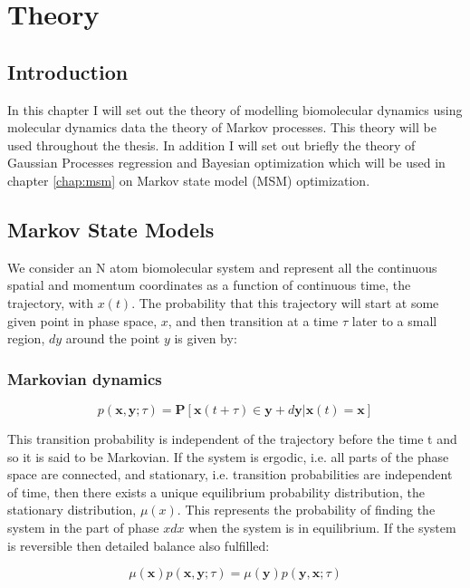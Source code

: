 %
\let\textcircled=\pgftextcircled
\chapter{Theory}
\label{chap:theory}

\section{Introduction}
In this chapter I will set out the theory of modelling biomolecular dynamics using molecular dynamics data the theory of Markov processes. This theory will be used throughout the thesis. In addition I will set out briefly the theory of Gaussian Processes regression and Bayesian optimization which will be used in chapter \ref{chap:msm} on Markov state model (MSM) optimization. 

\section{Markov State Models}
We consider an N atom biomolecular system and represent all the continuous spatial and momentum coordinates as a function of continuous time, the trajectory, with $x(t)$. The probability that this trajectory will start at some given point in phase space, $x$, and then transition at a time $\tau$ later to a small region, $dy$ around the point $y$ is given by: 

\subsection{Markovian dynamics}
\begin{equation}
p(\mathbf{x}, \mathbf{y} ; \tau)=\mathbf{P}[\mathbf{x}(t+\tau) \in \mathbf{y}+d \mathbf{y} | \mathbf{x}(t)=\mathbf{x}]
\end{equation}

This transition probability is independent of the trajectory before the time t and so it is said to be Markovian. If the system is ergodic, i.e. all parts of the phase space are connected, and stationary, i.e. transition probabilities are independent of time, then there exists a unique equilibrium probability distribution, the stationary distribution, $\mu(x)$. This represents the probability of finding the system in the part of phase $x dx$ when the system is in equilibrium. If the system is reversible then detailed balance also fulfilled: 

\begin{equation}
\mu(\mathbf{x}) p(\mathbf{x}, \mathbf{y} ; \tau)=\mu(\mathbf{y}) p(\mathbf{y}, \mathbf{x} ; \tau)
\end{equation}


